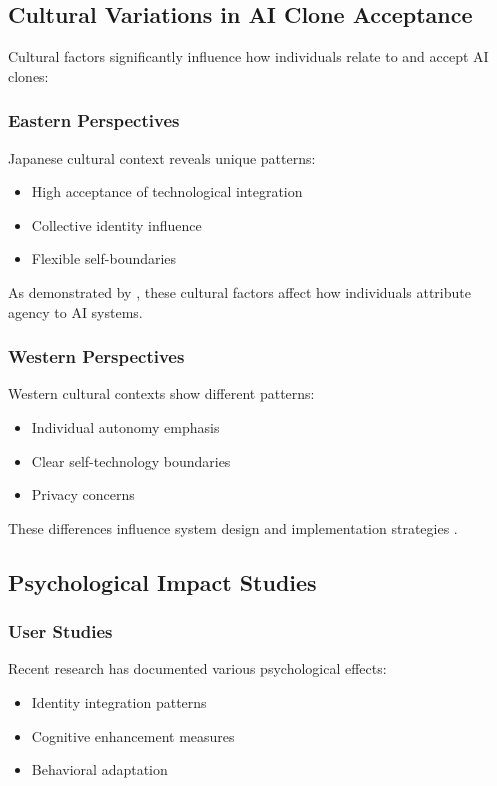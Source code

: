 \subsection{Cultural Variations in AI Clone Acceptance}

Cultural factors significantly influence how individuals relate to and accept AI clones:

\subsubsection{Eastern Perspectives}
Japanese cultural context reveals unique patterns:
\begin{itemize}
\item High acceptance of technological integration
\item Collective identity influence
\item Flexible self-boundaries
\end{itemize}
As demonstrated by \citet{nakagawa2019cultural}, these cultural factors affect how individuals attribute agency to AI systems.

\subsubsection{Western Perspectives}
Western cultural contexts show different patterns:
\begin{itemize}
\item Individual autonomy emphasis
\item Clear self-technology boundaries
\item Privacy concerns
\end{itemize}
These differences influence system design and implementation strategies \citep{dejuan2024western}.

\subsection{Psychological Impact Studies}

\subsubsection{User Studies}
Recent research has documented various psychological effects:
\begin{itemize}
\item Identity integration patterns
\item Cognitive enhancement measures
\item Behavioral adaptation
\end{itemize}

